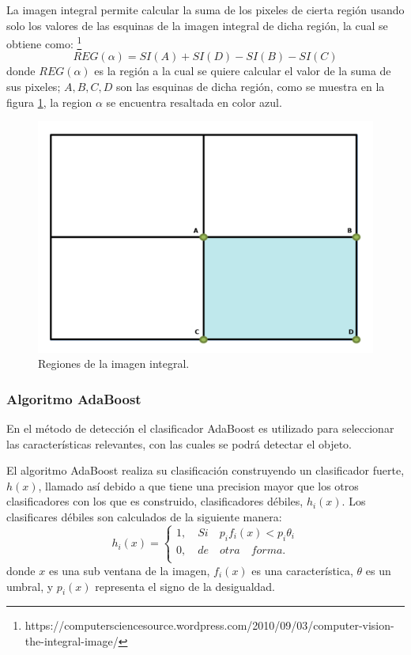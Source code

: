 La imagen integral permite calcular la suma de los pixeles de cierta región usando solo los valores de las esquinas de la imagen integral de dicha región, la cual se obtiene como: \footnote{https://computersciencesource.wordpress.com/2010/09/03/computer-vision-the-integral-image/}   
$$REG(\alpha)=SI(A)+SI(D)-SI(B)-SI(C)$$
donde $REG(\alpha)$ es la región a la cual se quiere calcular el valor de la suma de sus pixeles; $A,B,C,D$ son las esquinas de dicha región, como se muestra en la figura \ref{fig:figImageIntegral}, la region $\alpha$ se encuentra resaltada en color azul.  
\begin{figure}[h!]
\begin{center}
\includegraphics[scale=.3]{./Figures/IntegralImage.png}
\end{center}
\caption{Regiones de la imagen integral.}
\label{fig:figImageIntegral}
\end{figure} 


\subsubsection{Algoritmo AdaBoost}\label{sssec:AdaboostClasifier}  

En el método de detección el clasificador AdaBoost es utilizado para seleccionar las características relevantes, con las cuales se podrá detectar el objeto. 

El algoritmo AdaBoost realiza su clasificación construyendo un clasificador fuerte, $h(x)$, llamado así debido a que tiene una precision mayor que los otros clasificadores con los que es construido, clasificadores débiles, $h_i(x)$. Los clasificares débiles son calculados de la siguiente manera: 
$$h_i(x)=
\begin{cases}   
1, \quad Si \quad  p_if_i(x)<p_i \theta_i \\
0, \quad de \quad otra \quad forma.\\
\end{cases}$$
donde $x$ es una sub ventana de la imagen, $f_i(x)$ es una característica, $\theta$ es un umbral, y $p_i(x)$ representa el signo de la desigualdad.   


